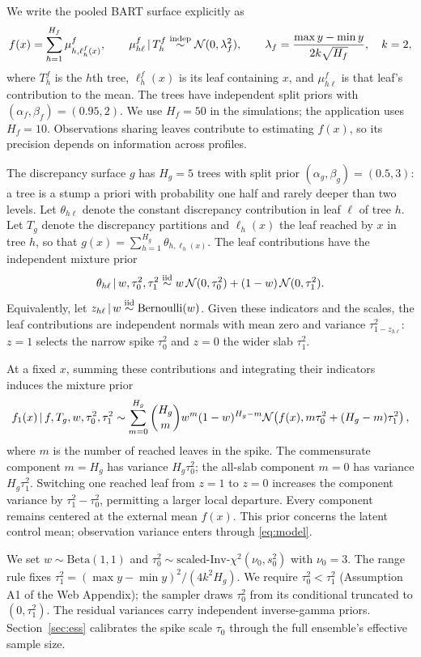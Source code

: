 We write the pooled BART surface explicitly as
\[
f(x)=\sum_{h=1}^{H_f}\mu^f_{h,\ell_h^f(x)},\qquad
\mu^f_{h\ell}\,\vert\, T_h^f\stackrel{\text{indep}}{\sim}\mathcal{N}(0,\lambda_f^2),\qquad
\lambda_f=\frac{\max y-\min y}{2k\sqrt{H_f}},\quad k=2,
\]
where $T_h^f$ is the $h$th tree, $\ell_h^f(x)$ is its leaf containing $x$, and $\mu^f_{h\ell}$ is that leaf's contribution to the mean. The trees have independent split priors with $(\alpha_f,\beta_f)=(0.95,2)$. We use $H_f=50$ in the simulations; the application uses $H_f=10$. Observations sharing leaves contribute to estimating $f(x)$, so its precision depends on information across profiles.

The discrepancy surface $g$ has $H_g=5$ trees with split prior $(\alpha_g,\beta_g)=(0.5,3)$: a tree is a stump a priori with probability one half and rarely deeper than two levels. Let $\theta_{h\ell}$ denote the constant discrepancy contribution in leaf $\ell$ of tree $h$. Let $T_g$ denote the discrepancy partitions and $\ell_h(x)$ the leaf reached by $x$ in tree $h$, so that $g(x)=\sum_{h=1}^{H_g}\theta_{h,\ell_h(x)}$. The leaf contributions have the independent mixture prior
\begin{equation}
\theta_{h\ell}\,\vert\, w,\tau_0^2,\tau_1^2
\stackrel{\text{iid}}{\sim} w\,\mathcal{N}(0,\tau_0^2)+(1-w)\,\mathcal{N}(0,\tau_1^2).
\label{eq:leafprior}
\end{equation}
Equivalently, let $z_{h\ell}\,\vert\, w\stackrel{\text{iid}}{\sim}\mathrm{Bernoulli}(w)$. Given these indicators and the scales, the leaf contributions are independent normals with mean zero and variance $\tau_{1-z_{h\ell}}^2$: $z=1$ selects the narrow spike $\tau_0^2$ and $z=0$ the wider slab $\tau_1^2$.

At a fixed $x$, summing these contributions and integrating their indicators induces the mixture prior
\[
f_1(x)\,\vert\, f,T_g,w,\tau_0^2,\tau_1^2
\sim\sum_{m=0}^{H_g}\binom{H_g}{m}w^m(1-w)^{H_g-m}
\mathcal{N}\!\left(f(x),m\tau_0^2+(H_g-m)\tau_1^2\right),
\]
where $m$ is the number of reached leaves in the spike. The commensurate component $m=H_g$ has variance $H_g\tau_0^2$; the all-slab component $m=0$ has variance $H_g\tau_1^2$. Switching one reached leaf from $z=1$ to $z=0$ increases the component variance by $\tau_1^2-\tau_0^2$, permitting a larger local departure. Every component remains centered at the external mean $f(x)$. This prior concerns the latent control mean; observation variance enters through \eqref{eq:model}.

We set $w\sim\mathrm{Beta}(1,1)$ and $\tau_0^2\sim\text{scaled-Inv-}\chi^2(\nu_0,s_0^2)$ with $\nu_0=3$. The range rule fixes $\tau_1^2=(\max y-\min y)^2/(4k^2H_g)$. We require $\tau_0^2<\tau_1^2$ (Assumption A1 of the Web Appendix); the sampler draws $\tau_0^2$ from its conditional truncated to $(0,\tau_1^2)$. The residual variances carry independent inverse-gamma priors. Section~\ref{sec:ess} calibrates the spike scale $\tau_0$ through the full ensemble's effective sample size.

